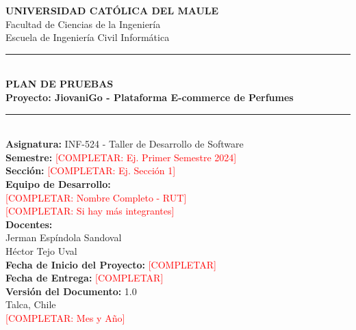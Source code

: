 \documentclass[12pt,a4paper]{article}
\begin{document}
\begin{titlepage}
    \centering
    \vspace*{2cm}

    {\Large \textbf{UNIVERSIDAD CATÓLICA DEL MAULE}}\\[0.5cm]
    {\large Facultad de Ciencias de la Ingeniería}\\[0.3cm]
    {\large Escuela de Ingeniería Civil Informática}\\[2cm]

    \rule{\linewidth}{0.5mm}\\[0.4cm]
    {\LARGE \textbf{PLAN DE PRUEBAS}}\\[0.2cm]
    {\Large \textbf{Proyecto: JiovaniGo - Plataforma E-commerce de Perfumes}}\\[0.2cm]
    \rule{\linewidth}{0.5mm}\\[1.5cm]

    {\large \textbf{Asignatura:} INF-524 - Taller de Desarrollo de Software}\\[0.3cm]
    {\large \textbf{Semestre:} \textcolor{red}{[COMPLETAR: Ej. Primer Semestre 2024]}}\\[0.3cm]
    {\large \textbf{Sección:} \textcolor{red}{[COMPLETAR: Ej. Sección 1]}}\\[1.5cm]

    {\large \textbf{Equipo de Desarrollo:}}\\[0.3cm]
    \textcolor{red}{[COMPLETAR: Nombre Completo - RUT]}\\
    \textcolor{red}{[COMPLETAR: Si hay más integrantes]}\\[1.5cm]

    {\large \textbf{Docentes:}}\\[0.3cm]
    Jerman Espíndola Sandoval\\
    Héctor Tejo Uval\\[1.5cm]

    {\large \textbf{Fecha de Inicio del Proyecto:} \textcolor{red}{[COMPLETAR]}}\\[0.3cm]
    {\large \textbf{Fecha de Entrega:} \textcolor{red}{[COMPLETAR]}}\\[0.3cm]
    {\large \textbf{Versión del Documento:} 1.0}\\[2cm]

    \vfill
    {\large Talca, Chile}\\
    {\large \textcolor{red}{[COMPLETAR: Mes y Año]}}

\end{titlepage}
\end{document}
